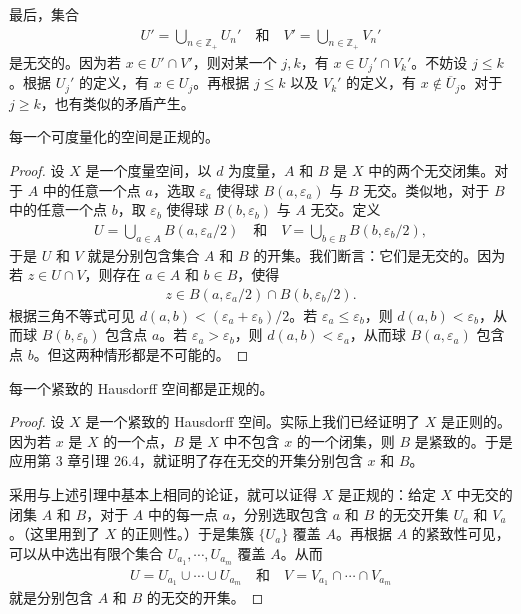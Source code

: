 最后，集合
\begin{align*}
U'=\bigcup_{n\in\mathbb{Z}_{+}}U_{n}'\quad\text{和}\quad V'=\bigcup_{n\in\mathbb{Z}_{+}}V_{n}'
\end{align*}
是无交的。因为若 $x\in U'\cap V'$，则对某一个 $j,k$，有 $x\in U_{j}'\cap V_{k}'$。不妨设 $j\leqslant k$。根据 $U_{j}'$ 的定义，有 $x\in U_{j}$。再根据 $j\leqslant k$ 以及 $V_{k}'$ 的定义，有 $x\notin\overline{U}_{j}$。对于 $j\geqslant k$，也有类似的矛盾产生。

\begin{theorem}\label{theorem:ch04-metrizable-normal}
每一个可度量化的空间是正规的。
\end{theorem}

\begin{proof}
设 $X$ 是一个度量空间，以 $d$ 为度量，$A$ 和 $B$ 是 $X$ 中的两个无交闭集。对于 $A$ 中的任意一个点 $a$，选取 $\varepsilon_{a}$ 使得球 $B(a,\varepsilon_{a})$ 与 $B$ 无交。类似地，对于 $B$ 中的任意一个点 $b$，取 $\varepsilon_{b}$ 使得球 $B(b,\varepsilon_{b})$ 与 $A$ 无交。定义
\begin{align*}
U=\bigcup_{a\in A}B(a,\varepsilon_{a}/2)\quad\text{和}\quad V=\bigcup_{b\in B}B(b,\varepsilon_{b}/2),
\end{align*}
于是 $U$ 和 $V$ 就是分别包含集合 $A$ 和 $B$ 的开集。我们断言：它们是无交的。因为若 $z\in U\cap V$，则存在 $a\in A$ 和 $b\in B$，使得
\begin{align*}
z\in B(a,\varepsilon_{a}/2)\cap B(b,\varepsilon_{b}/2).
\end{align*}
根据三角不等式可见 $d(a,b)<(\varepsilon_{a}+\varepsilon_{b})/2$。若 $\varepsilon_{a}\leqslant\varepsilon_{b}$，则 $d(a,b)<\varepsilon_{b}$，从而球 $B(b,\varepsilon_{b})$ 包含点 $a$。若 $\varepsilon_{a}>\varepsilon_{b}$，则 $d(a,b)<\varepsilon_{a}$，从而球 $B(a,\varepsilon_{a})$ 包含点 $b$。但这两种情形都是不可能的。
\end{proof}

\begin{theorem}\label{theorem:ch04-compact-hausdorff-normal}
每一个紧致的 Hausdorff 空间都是正规的。
\end{theorem}

\begin{proof}
设 $X$ 是一个紧致的 Hausdorff 空间。实际上我们已经证明了 $X$ 是正则的。因为若 $x$ 是 $X$ 的一个点，$B$ 是 $X$ 中不包含 $x$ 的一个闭集，则 $B$ 是紧致的。于是应用第 3 章引理 26.4，就证明了存在无交的开集分别包含 $x$ 和 $B$。

采用与上述引理中基本上相同的论证，就可以证得 $X$ 是正规的：给定 $X$ 中无交的闭集 $A$ 和 $B$，对于 $A$ 中的每一点 $a$，分别选取包含 $a$ 和 $B$ 的无交开集 $U_{a}$ 和 $V_{a}$。（这里用到了 $X$ 的正则性。）于是集簇 $\{U_{a}\}$ 覆盖 $A$。再根据 $A$ 的紧致性可见，可以从中选出有限个集合 $U_{a_{1}},\cdots,U_{a_{m}}$ 覆盖 $A$。从而
\begin{align*}
U=U_{a_{1}}\cup\cdots\cup U_{a_{m}}\quad\text{和}\quad V=V_{a_{1}}\cap\cdots\cap V_{a_{m}}
\end{align*}
就是分别包含 $A$ 和 $B$ 的无交的开集。
\end{proof}

